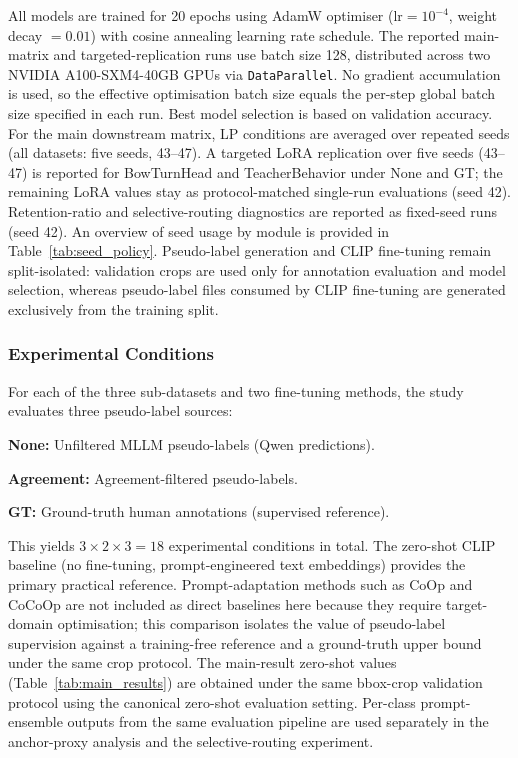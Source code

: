 \documentclass{ieeeaccess}
\providecommand{\DIFaddbegin}{} %
\providecommand{\DIFaddend}{} %
\providecommand{\DIFdelbegin}{} %
\providecommand{\DIFdelend}{} %
\newcommand{\DIFscaledelfig}{0.5}
\newlength{\DIFdelgraphicswidth} %
\newlength{\DIFdelgraphicsheight} %
\newcommand{\DIFaddincludegraphics}[2][]{{\color{blue}\fbox{\DIFOincludegraphics[#1]{#2}}}} %
\newcommand{\DIFdelincludegraphics}[2][]{%
\sbox{\DIFdelgraphicsbox}{\DIFOincludegraphics[#1]{#2}}%
\settoboxwidth{\DIFdelgraphicswidth}{\DIFdelgraphicsbox} %
\settoboxtotalheight{\DIFdelgraphicsheight}{\DIFdelgraphicsbox} %
\scalebox{\DIFscaledelfig}{%
\parbox[b]{\DIFdelgraphicswidth}{\usebox{\DIFdelgraphicsbox}\\[-\baselineskip] \rule{\DIFdelgraphicswidth}{0em}}\llap{\resizebox{\DIFdelgraphicswidth}{\DIFdelgraphicsheight}{%
\setlength{\unitlength}{\DIFdelgraphicswidth}%
\begin{picture}(1,1)%
\thicklines\linethickness{2pt} %
{\color[rgb]{1,0,0}\put(0,0){\framebox(1,1){}}}%
{\color[rgb]{1,0,0}\put(0,0){\line( 1,1){1}}}%
{\color[rgb]{1,0,0}\put(0,1){\line(1,-1){1}}}%
\end{picture}%
}\hspace*{3pt}}} %
} %
\DeclareRobustCommand{\DIFaddbegin}{\DIFOaddbegin \let\includegraphics\DIFaddincludegraphics} %
\DeclareRobustCommand{\DIFaddend}{\DIFOaddend \let\includegraphics\DIFOincludegraphics} %
\DeclareRobustCommand{\DIFdelbegin}{\DIFOdelbegin \let\includegraphics\DIFdelincludegraphics} %
\DeclareRobustCommand{\DIFdelend}{\DIFOaddend \let\includegraphics\DIFOincludegraphics} %
\begin{document}
All models are trained for 20 epochs using AdamW optimiser
($\text{lr}=10^{-4}$, weight decay $= 0.01$) with cosine annealing
learning rate schedule.
The reported main-matrix and targeted-replication runs use batch size
128, distributed across two NVIDIA
A100-SXM4-40GB GPUs via \texttt{DataParallel}.
No gradient accumulation is used, so the effective optimisation batch
size equals the per-step global batch size specified in each run.
Best model selection is based on validation accuracy.
For the main downstream matrix, LP conditions are averaged over
repeated seeds (all datasets: five seeds, 43--47). A targeted LoRA replication over five seeds
(43--47) is reported for BowTurnHead and TeacherBehavior under None
and GT; the remaining LoRA values stay as protocol-matched single-run
evaluations (seed 42).
Retention-ratio and selective-routing diagnostics are reported as
fixed-seed runs (seed 42).
An overview of seed usage by module is provided in
Table~\ref{tab:seed_policy}.
Pseudo-label generation and CLIP fine-tuning remain split-isolated:
validation crops are used only for annotation evaluation and model
selection, whereas pseudo-label files consumed by CLIP fine-tuning are
generated exclusively from the training split.

\subsubsection{Experimental Conditions}

For each of the three sub-datasets and two fine-tuning methods,
the study evaluates three pseudo-label sources:

\DIFdelbegin %
\DIFdelend \DIFaddbegin \noindent\DIFaddend \textbf{None:} Unfiltered MLLM pseudo-labels (Qwen predictions).
\DIFdelbegin %
\DIFdelend \DIFaddbegin 

\noindent\DIFaddend \textbf{Agreement:} Agreement-filtered pseudo-labels.
\DIFdelbegin %
\DIFdelend \DIFaddbegin 

\noindent\DIFaddend \textbf{GT:} Ground-truth human annotations (supervised reference).
\DIFdelbegin %
\DIFdelend 

This yields $3 \times 2 \times 3 = 18$ experimental conditions in total.
The zero-shot CLIP baseline (no fine-tuning,
prompt-engineered text embeddings) provides the primary practical
reference.
Prompt-adaptation methods such as CoOp and CoCoOp are not included as
direct baselines here because they require target-domain optimisation;
this comparison isolates the value of pseudo-label supervision
against a training-free reference and a ground-truth upper bound under
the same crop protocol.
The main-result zero-shot values (Table~\ref{tab:main_results}) are
obtained under the same bbox-crop validation protocol using the
canonical zero-shot evaluation setting.
Per-class prompt-ensemble outputs from the same
evaluation pipeline are used separately in the anchor-proxy
analysis and the selective-routing experiment.
\end{document}
